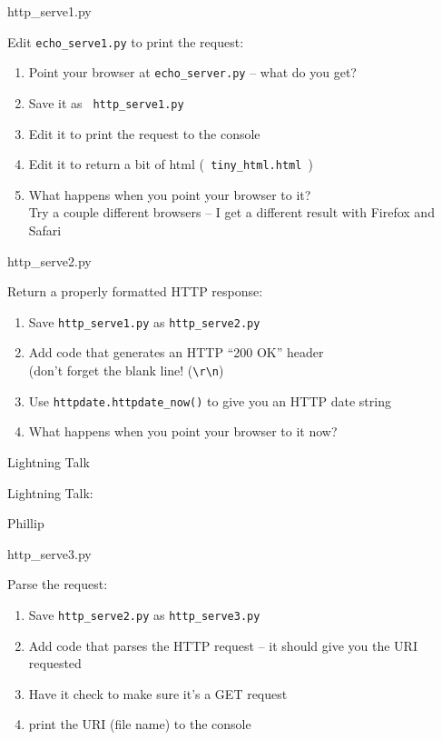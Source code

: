\documentclass{beamer}
\begin{document}
\begin{frame}[fragile]{http\_serve1.py}

{\Large Edit \verb|echo_serve1.py| to print the request:}
\begin{enumerate}
  \item Point your browser at \verb|echo_server.py| -- what do you get?
  \item Save it as \verb| http_serve1.py |
  \item Edit it to print the request to the console
  \item Edit it to return a bit of html (\verb| tiny_html.html |)
  \item What happens when you point your browser to it? \\
        Try a couple different browsers -- I get a different result with Firefox and Safari
\end{enumerate}

\end{frame}

\begin{frame}[fragile]{http\_serve2.py}

{\Large Return a properly formatted HTTP response:}
\begin{enumerate}
  \item Save \verb|http_serve1.py|  as \verb|http_serve2.py|
  \item Add code that generates an HTTP ``200 OK'' header \\
        (don't forget the blank line! (\verb|\r\n|)
  \item Use \verb|httpdate.httpdate_now()| to give you an HTTP date string
  \item What happens when you point your browser to it now?
\end{enumerate}

\end{frame}

\begin{frame}{Lightning Talk}

{\centering

\vfill
{\LARGE Lightning Talk:  }

\vfill
{\Huge Phillip}

\vfill
}
\end{frame}


\begin{frame}[fragile]{http\_serve3.py}

{\Large Parse the request:}
\begin{enumerate}
  \item Save \verb|http_serve2.py|  as \verb|http_serve3.py|
  \item Add code that parses the HTTP request -- it should give you the URI requested
  \item Have it check to make sure it's a GET request
  \item print the URI (file name) to the console
\end{enumerate}

\end{frame}
\end{document}
